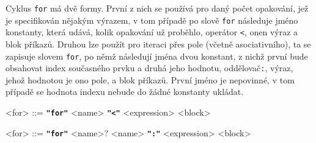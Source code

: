 \documentclass[a4paper,12pt]{article}
\def\quote #1{"#1"}
\def\emphasis #1{\textbf{\texttt{\quote{#1}}}}
\begin{document}
Cyklus \texttt{for} má dvě formy. První z nich se používá pro daný počet opakování, jež je specifikován nějakým výrazem, v tom případě po slově \texttt{for} následuje jméno konstanty, která udává, kolik opakování už proběhlo, operátor \texttt{\textless}, onen výraz a blok příkazů. Druhou lze použít pro iteraci přes pole (včetně asociativního), ta se zapisuje slovem \texttt{for}, po němž následují jména dvou konstant, z nichž první bude obsahovat index současného prvku a druhá jeho hodnotu, oddělovač\texttt{:}, výraz, jehož hodnotou je ono pole, a blok příkazů. První jméno je nepovinné, v tom případě se hodnota indexu nebude do žádné konstanty ukládat.
\begin{grammar}
<for> ::= \emphasis{for} <name> \emphasis{\textless} <expression> <block>

<for> ::= \emphasis{for} <name>? <name> \emphasis{:} <expression> <block>
\end{grammar}
\end{document}
